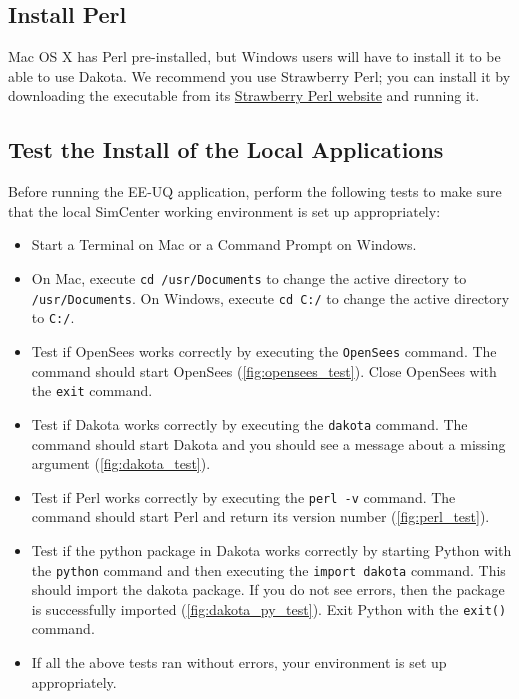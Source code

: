 \subsection{Install  Perl}

Mac OS X has Perl pre-installed, but Windows users will have to
install it to be able to use Dakota. We recommend you use Strawberry
Perl; you can install it by downloading the executable from
its \href{http://strawberryperl.com}{Strawberry Perl website} and
running it.

\subsection{Test the Install of the Local Applications}

Before running the EE-UQ application, perform the following tests to
make sure that the local SimCenter working environment is set up
appropriately:

\begin{itemize}
    \item Start a Terminal on Mac or a Command Prompt on Windows.
    \item On Mac, execute \texttt{cd /usr/Documents} to change the active directory to \texttt{/usr/Documents}. On Windows, execute \texttt{cd C:/} to change the active directory to \texttt{C:/}.
    \item Test if OpenSees works correctly by executing the \texttt{OpenSees} command. The command should start OpenSees (\autoref{fig:opensees_test}). Close OpenSees with the \texttt{exit} command.
    \item Test if Dakota works correctly by executing the \texttt{dakota} command. The command should start Dakota and you should see a message about a missing argument (\autoref{fig:dakota_test}).
    \item Test if Perl works correctly by executing the \texttt{perl -v} command. The command should start Perl and return its version number (\autoref{fig:perl_test}).
    \item Test if the python package in Dakota works correctly by starting Python with the \texttt{python} command and then executing the \texttt{import dakota} command. This should import the dakota package. If you do not see errors, then the package is successfully imported (\autoref{fig:dakota_py_test}). Exit Python with the \texttt{exit()} command.
    \item If all the above tests ran without errors, your environment is set up appropriately.
\end{itemize}

